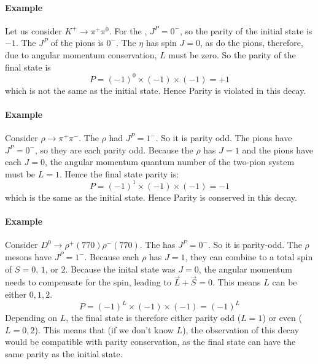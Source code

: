 \paragraph{Example}
Let us consider $K^+ \to \pi^+ \pi^0$. For the , $J^P = 0^-$, so the parity of the initial state is $-1$. The $J^P$ of the pions is $0^-$.  The $\eta$ has spin $J=0$, as do the pions, therefore, due to angular momentum conservation, $L$ must be zero. So the parity of the final state is
\[
P = (-1)^{0} \times (-1) \times (-1) = +1
\]
which is not the same as the initial state. Hence Parity is violated in this decay.

\paragraph{Example}
Consider $\rho \to \pi^+ \pi^-$. The $\rho$ had $J^P=1^-$. So it is parity odd. The pions have $J^P=0^-$, so they are each parity odd. Because the $\rho$ has $J=1$ and the pions have each $J=0$, the angular momentum quantum number of the two-pion system must be $L=1$. Hence the final state parity is:
\[
P = (-1)^{1} \times (-1) \times (-1) = -1
\]
which is the same as the initial state. Hence Parity is conserved in this decay.

\paragraph{Example}
Consider $D^0 \to \rho^+(770) \rho^-(770)$. The  has $J^{P}=0^-$. So it is parity-odd. The $\rho$ mesons have $J^P=1^-$. Because each $\rho$ has $J=1$, they can combine to a total spin of $S=0$, $1$, or $2$. Because the inital state was $J=0$, the angular momentum needs to compensate for the spin, leading to $\vec{L}+\vec{S}=0$. This means $L$ can be either $0,1,2$.
\[
P = (-1)^{L} \times (-1) \times (-1) = (-1)^L
\]
Depending on $L$, the final state is therefore either parity odd ($L=1$) or even ($L=0,2$). This means that (if we don't know $L$), the observation of this decay would be compatible with parity conservation, as the final state can have the same parity as the initial state.

